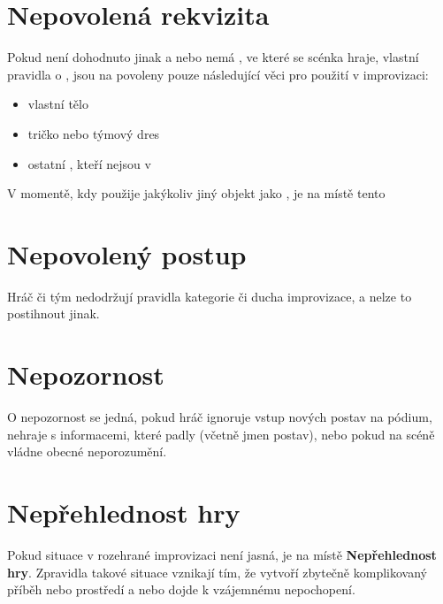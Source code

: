  
\needspace{5cm} \section{Nepovolená rekvizita} \label{nepovolená rekvizita}  
 
Pokud není dohodnuto jinak a nebo nemá , ve které se scénka hraje, vlastní pravidla o , jsou na  povoleny pouze následující věci pro použití v improvizaci: 
 
\begin{itemize}
\item  vlastní tělo
\item  tričko nebo týmový dres
\item  ostatní , kteří nejsou v 
\end{itemize}
 
V momentě, kdy  použije jakýkoliv jiný objekt jako , je na místě tento  
 
 
\needspace{5cm} \section{Nepovolený postup} \label{nepovolený postup}  
 
 
Hráč či tým nedodržují pravidla kategorie či ducha improvizace, a nelze to postihnout jinak. 
\needspace{5cm} \section{Nepozornost} \label{nepozornost}  
 
O nepozornost se jedná, pokud hráč ignoruje vstup nových postav na pódium, 
nehraje s informacemi, které padly (včetně jmen postav), nebo pokud na scéně  
vládne obecné neporozumění. 
 
 
\needspace{5cm} \section{Nepřehlednost hry} \label{nepřehlednost hry}  
 
Pokud situace v rozehrané improvizaci není jasná, je na místě  \textbf{Nepřehlednost hry}{}. Zpravidla takové situace vznikají tím, že  vytvoří zbytečně komplikovaný příběh nebo prostředí a nebo dojde k vzájemnému nepochopení. 
 
